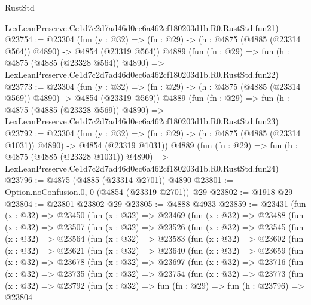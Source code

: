 \begin{lexlean}{RustStd}
\begin{coremodule}
    LexLeanPreserve.Ce1d7c2d7ad46d0ec6a462cf180203d1b.R0.RustStd.fun21)
@23754 := @23304
    (fun (y : @32) => (fn : @29) -> (h : @4875 (@4885 (@23314 @564)) @4890) -> @4854 (@23319 @564))
    @4889
    (fun (fn : @29) =>
    fun (h : @4875 (@4885 (@23328 @564)) @4890) =>
    LexLeanPreserve.Ce1d7c2d7ad46d0ec6a462cf180203d1b.R0.RustStd.fun22)
@23773 := @23304
    (fun (y : @32) => (fn : @29) -> (h : @4875 (@4885 (@23314 @569)) @4890) -> @4854 (@23319 @569))
    @4889
    (fun (fn : @29) =>
    fun (h : @4875 (@4885 (@23328 @569)) @4890) =>
    LexLeanPreserve.Ce1d7c2d7ad46d0ec6a462cf180203d1b.R0.RustStd.fun23)
@23792 := @23304
    (fun (y : @32) =>
    (fn : @29) -> (h : @4875 (@4885 (@23314 @1031)) @4890) -> @4854 (@23319 @1031))
    @4889
    (fun (fn : @29) =>
    fun (h : @4875 (@4885 (@23328 @1031)) @4890) =>
    LexLeanPreserve.Ce1d7c2d7ad46d0ec6a462cf180203d1b.R0.RustStd.fun24)
@23796 := @4875 (@4885 (@23314 @2701)) @4890
@23801 := Option.noConfusion.{0, 0} (@4854 (@23319 @2701)) @29
@23802 := @1918 @29
@23804 := @23801 @23802 @29
@23805 := @4888 @4933
@23859 := @23431
    (fun (x : @32) =>
    @23450
      (fun (x : @32) =>
      @23469
        (fun (x : @32) =>
        @23488
          (fun (x : @32) =>
          @23507
            (fun (x : @32) =>
            @23526
              (fun (x : @32) =>
              @23545
                (fun (x : @32) =>
                @23564
                  (fun (x : @32) =>
                  @23583
                    (fun (x : @32) =>
                    @23602
                      (fun (x : @32) =>
                      @23621
                        (fun (x : @32) =>
                        @23640
                          (fun (x : @32) =>
                          @23659
                            (fun (x : @32) =>
                            @23678
                              (fun (x : @32) =>
                              @23697
                                (fun (x : @32) =>
                                @23716
                                  (fun (x : @32) =>
                                  @23735
                                    (fun (x : @32) =>
                                    @23754
                                      (fun (x : @32) =>
                                      @23773
                                        (fun (x : @32) =>
                                        @23792
                                          (fun (x : @32) =>
                                          fun (fn : @29) =>
                                          fun (h : @23796) =>
                                          @23804

\end{coremodule}
\end{lexlean}
